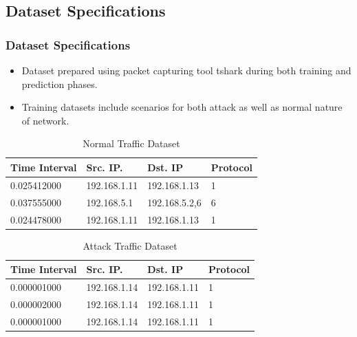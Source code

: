 \documentclass[10pt]{beamer}
\begin{document}
\begin{frame}
\section[]{Dataset Specifications}
\frametitle{Dataset Specifications}
\begin{itemize}
\footnotesize
\item
Dataset prepared using packet capturing tool tshark during both training and prediction phases.

\item
Training datasets include scenarios for both attack as well as normal nature of network.
\end{itemize}

\begin{table}
\scriptsize
\begin{center}
\begin{tabular}{ | m{1.5cm} | m{1.5cm}| m{1.5cm} | m{1cm} |} 
\hline
\textbf{Time Interval} & \textbf{Src. IP.} & \textbf{Dst. IP} & \textbf{Protocol} \\
\hline
0.025412000 & 192.168.1.11 & 192.168.1.13 & 1 \\
\hline
0.037555000 & 192.168.5.1 & 192.168.5.2,6 & 6 \\
\hline
0.024478000 & 192.168.1.11 & 192.168.1.13 & 1 \\
\hline
\end{tabular}
\end{center}
\caption{\footnotesize Normal Traffic Dataset}
\end{table}

\begin{table}
\scriptsize
\begin{center}
\begin{tabular}{ | m{1.5cm} | m{1.5cm}| m{1.5cm} | m{1cm} |} 
\hline
\textbf{Time Interval} & \textbf{Src. IP.} & \textbf{Dst. IP} & \textbf{Protocol} \\
\hline
0.000001000 & 192.168.1.14 & 192.168.1.11 & 1 \\
\hline
0.000002000 & 192.168.1.14 & 192.168.1.11 & 1 \\
\hline
0.000001000 & 192.168.1.14 & 192.168.1.11 & 1 \\
\hline
\end{tabular}
\end{center}
\caption{\footnotesize Attack Traffic Dataset}
\end{table}
\end{frame}
\end{document}
